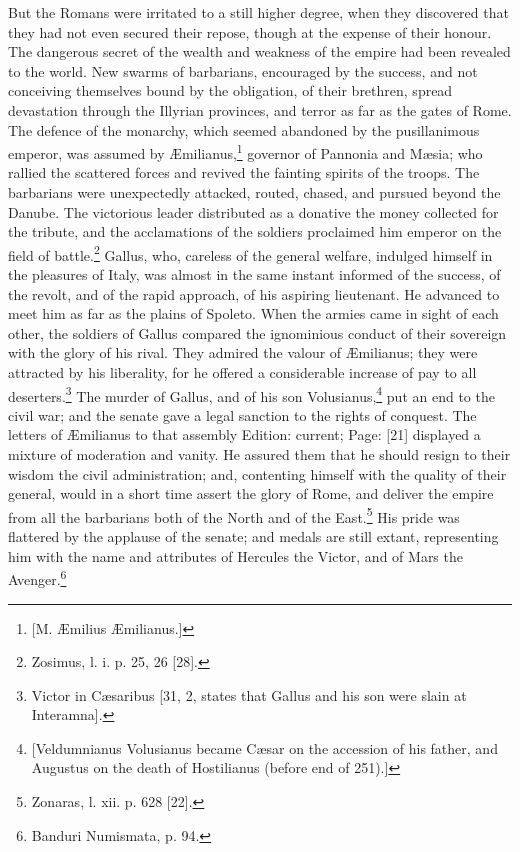 But the Romans were irritated to a still higher degree, when they discovered that they had not even secured their repose, though at the expense of their honour. The dangerous secret of the wealth and weakness of the empire had been revealed to the world. New swarms of barbarians, encouraged by the success, and not conceiving themselves bound by the obligation, of their brethren, spread devastation through the Illyrian provinces, and terror as far as the gates of Rome. The defence of the monarchy, which seemed abandoned by the pusillanimous emperor, was assumed by Æmilianus,\footnote{[M. Æmilius Æmilianus.]} governor of Pannonia and Mæsia; who rallied the scattered forces and revived the fainting spirits of the troops. The barbarians were unexpectedly attacked, routed, chased, and pursued beyond the Danube. The victorious leader distributed as a donative the money collected for the tribute, and the acclamations of the soldiers proclaimed him emperor on the field of battle.\footnote{Zosimus, l. i. p. 25, 26 [28].} Gallus, who, careless of the general welfare, indulged himself in the pleasures of Italy, was almost in the same instant informed of the success, of the revolt, and of the rapid approach, of his aspiring lieutenant. He advanced to meet him as far as the plains of Spoleto. When the armies came in sight of each other, the soldiers of Gallus compared the ignominious conduct of their sovereign with the glory of his rival. They admired the valour of Æmilianus; they were attracted by his liberality, for he offered a considerable increase of pay to all deserters.\footnote{Victor in Cæsaribus [31, 2, states that Gallus and his son were slain at Interamna].} The murder of Gallus, and of his son Volusianus,\footnote{[Veldumnianus Volusianus became Cæsar on the accession of his father, and Augustus on the death of Hostilianus (before end of 251).]} put an end to the civil war; and the senate gave a legal sanction to the rights of conquest. The letters of Æmilianus to that assembly Edition: current; Page: [21] displayed a mixture of moderation and vanity. He assured them that he should resign to their wisdom the civil administration; and, contenting himself with the quality of their general, would in a short time assert the glory of Rome, and deliver the empire from all the barbarians both of the North and of the East.\footnote{Zonaras, l. xii. p. 628 [22].} His pride was flattered by the applause of the senate; and medals are still extant, representing him with the name and attributes of Hercules the Victor, and of Mars the Avenger.\footnote{Banduri Numismata, p. 94.}

